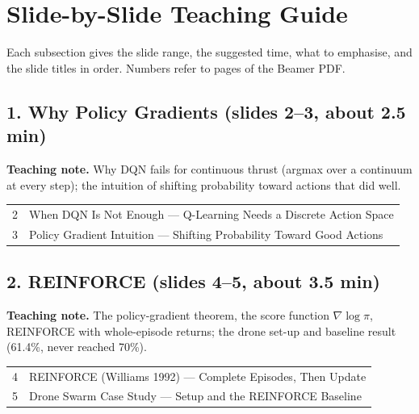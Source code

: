 \documentclass[11pt]{article}
\begin{document}
\section{Slide-by-Slide Teaching Guide}

Each subsection gives the slide range, the suggested time, what to emphasise, and the slide titles in order. Numbers refer to pages of the Beamer PDF.

\subsection{1. Why Policy Gradients \normalfont\small\color{GreyN}(slides 2--3, about 2.5 min)}

\textbf{Teaching note.} Why DQN fails for continuous thrust (argmax over a continuum at every step); the intuition of shifting probability toward actions that did well.

\begin{center}\small\renewcommand{\arraystretch}{1.1}\begin{tabularx}{\textwidth}{@{}r X@{}}2 & When DQN Is Not Enough --- Q-Learning Needs a Discrete Action Space\\
3 & Policy Gradient Intuition --- Shifting Probability Toward Good Actions\\\end{tabularx}\end{center}

\subsection{2. REINFORCE \normalfont\small\color{GreyN}(slides 4--5, about 3.5 min)}

\textbf{Teaching note.} The policy-gradient theorem, the score function $\nabla\log\pi$, REINFORCE with whole-episode returns; the drone set-up and baseline result (61.4\%, never reached 70\%).

\begin{center}\small\renewcommand{\arraystretch}{1.1}\begin{tabularx}{\textwidth}{@{}r X@{}}4 & REINFORCE (Williams 1992) --- Complete Episodes, Then Update\\
5 & Drone Swarm Case Study --- Setup and the REINFORCE Baseline\\\end{tabularx}\end{center}
\end{document}
